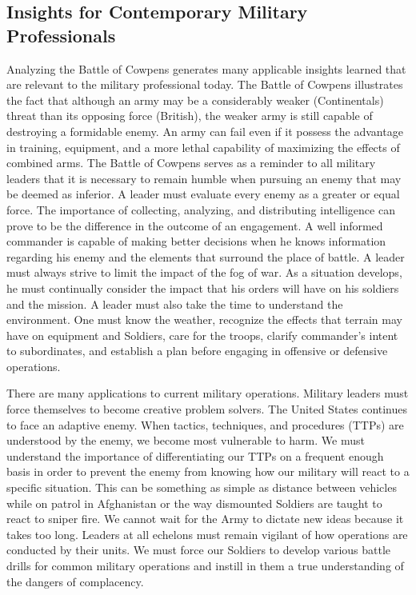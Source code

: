 \subsection{Insights for Contemporary Military Professionals}

Analyzing the Battle of Cowpens generates many applicable insights learned that
are relevant to the military professional today.  The Battle of Cowpens
illustrates the fact that although an army may be a considerably weaker
(Continentals) threat than its opposing force (British), the weaker army is
still capable of destroying a formidable enemy.  An army can fail even if it
possess the advantage in training, equipment, and a more lethal capability of
maximizing the effects of combined arms.  The Battle of Cowpens serves as a
reminder to all military leaders that it is necessary to remain humble when
pursuing an enemy that may be deemed as inferior.    A leader must evaluate
every enemy as a greater or equal force.  The importance of collecting,
analyzing, and distributing intelligence can prove to be the difference in the
outcome of an engagement.  A well informed commander is capable of making
better decisions when he knows information regarding his enemy and the elements
that surround the place of battle.  A leader must always strive to limit the
impact of the fog of war.  As a situation develops, he must continually
consider the impact that his orders will have on his soldiers and the mission.
A leader must also take the time to understand the environment.  One must know
the weather, recognize the effects that terrain may have on equipment and
Soldiers, care for the troops, clarify commander’s intent to subordinates, and
establish a plan before engaging in offensive or defensive operations.

There are many applications to current military operations.  Military leaders
must force themselves to become creative problem solvers.  The United States
continues to face an adaptive enemy.  When tactics, techniques, and procedures
(TTPs) are understood by the enemy, we become most vulnerable to harm.  We must
understand the importance of differentiating our TTPs on a frequent enough
basis in order to prevent the enemy from knowing how our military will react to
a specific situation.  This can be something as simple as distance between
vehicles while on patrol in Afghanistan or the way dismounted Soldiers are
taught to react to sniper fire.  We cannot wait for the Army to dictate new
ideas because it takes too long.  Leaders at all echelons must remain vigilant
of how operations are conducted by their units.  We must force our Soldiers to
develop various battle drills for common military operations and instill in
them a true understanding of the dangers of complacency.  

